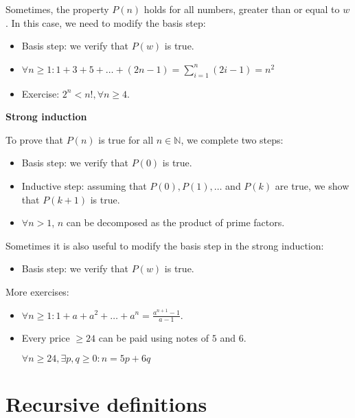 \documentclass[12pt, a4paper]{book}
\begin{document}
Sometimes, the property $P(n)$ holds for all numbers, greater than or equal to $w$. In this case, we need to modify the basis step:

\begin{itemize}
    \item Basis step: we verify that $P(w)$ is true.
\end{itemize} 

\begin{itemize}
    \item $\forall n \geq 1: 1+3+5+\ldots +(2n-1) = \sum_{i = 1}^{n}(2i-1) = n^2$
    \item Exercise: $2^n < n!, \forall n \geq 4$.
\end{itemize}

\begin{defn}
    \textbf{Strong induction}

    To prove that $P(n)$ is true for all $n\in\mathbb{N}$, we complete two steps:
    \begin{itemize}
        \item Basis step: we verify that $P(0)$ is true.
        \item Inductive step: assuming that $P(0),P(1),\ldots$ and $P(k)$ are true, we show that $P(k+1)$ is true.
    \end{itemize}
\end{defn}

\begin{itemize}
    \item $\forall n>1$, $n$ can be decomposed as the product of prime factors.
\end{itemize}

Sometimes it is also useful to modify the basis step in the strong induction:

\begin{itemize}
    \item Basis step: we verify that $P(w)$ is true.
\end{itemize}

More exercises:
\begin{itemize}
    \item $\displaystyle \forall n \geq 1: 1+a+a^2+\ldots + a^n = \frac{a^{n+1}-1}{a-1}$.
    \item Every price $\geq 24$ can be paid using notes of $5$ and $6$.

    $\forall n \geq 24, \exists p,q\geq 0: n = 5p + 6q$
\end{itemize}


\section{Recursive definitions}
\end{document}
